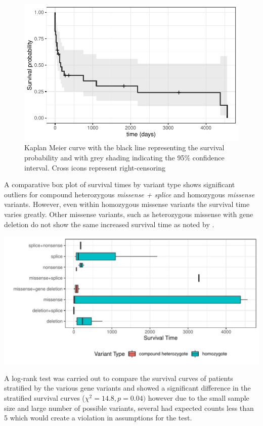 \documentclass[
  authoryear,
  preprint,
  3p]{elsarticle}
\begin{document}
\begin{figure}

{\centering \includegraphics{paper_files/figure-pdf/fig-surv-1.pdf}

}

\caption{\label{fig-surv}Kaplan Meier curve with the black line
representing the survival probability and with grey shading indicating
the 95\% confidence interval. Cross icons represent right-censoring}

\end{figure}

A comparative box plot of survival times by variant type shows
significant outliers for compound heterozygous \emph{missense + splice}
and homozygous \emph{missense} variants. However, even within homozygous
missense variants the survival time varies greatly. Other missense
variants, such as heterozygous missense with gene deletion do not show
the same increased survival time as noted by \citet{magini2019loss}.

\includegraphics{paper_files/figure-pdf/unnamed-chunk-14-1.pdf}

A log-rank test was carried out to compare the survival curves of
patients stratified by the various gene variants and showed a
significant difference in the stratified survival curves
(\(\chi^2 = 14.8, p = 0.04)\) however due to the small sample size and
large number of possible variants, several had expected counts less than
5 which would create a violation in assumptions for the test.
\end{document}
